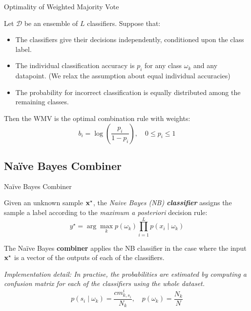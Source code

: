 \documentclass[xcolor=table]{beamer}
\begin{document}
\begin{frame}{Optimality of Weighted Majority Vote}

    \begin{theorem}
        Let \(\mathbf{\mathcal D}\) be an ensemble of \(L\) classifiers. Suppose that:
        \begin{itemize}
            \item The classifiers give their decisions independently, conditioned upon the class label.
            \item The individual classification accuracy is \(p_i\) for any class \(\omega_k\) and any datapoint. {\color{brown} (We relax the assumption about equal individual accuracies)}
            \item The probability for incorrect classification is equally distributed among the remaining classes.
        \end{itemize}
        Then the WMV is the optimal combination rule with weights:
        \begin{equation}
            b_i = \log \left( \frac{p_i}{1-p_i}\right), \quad 0 \leq p_i \leq 1
        \end{equation}
    \end{theorem}
\end{frame}

\subsection{Naïve Bayes Combiner}
\begin{frame}{Naïve Bayes Combiner}
    \begin{definition}
        Given an unknown sample \({\mathbf x}^\star\), the \emph{Naive Bayes (NB) \textbf{classifier}} assigns the sample a label according to the \emph{maximum a posteriori} decision rule:
        \[
        y^\star = \arg \max_{k} p(\omega_k) \prod_{i=1}^L p(x_i \mid \omega_k)
        \]
    \end{definition}
    The Naïve Bayes \textbf{combiner} applies the NB classifier in the case where the input \({\mathbf x}^\star\) is a vector of the outputs of each of the classifiers.\\

\pause

    \emph{Implementation detail: In practise, the probabilities are estimated by computing a confusion matrix for each of the classifiers using the whole dataset.}
    \[
    p(s_i \mid \omega_k) = \frac{cm^i_{k,s_i}}{N_k}, \quad p(\omega_k) = \frac{N_k}{N}
    \] 

\end{frame}
\end{document}
